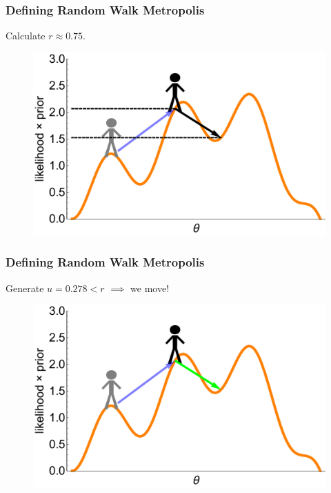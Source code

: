 \documentclass[handout]{beamer}
\begin{document}
\begin{frame}
\frametitle{Defining Random Walk Metropolis}
Calculate $r\approx 0.75$.

\begin{figure}[ht]
\centerline{\includegraphics[width=1\textwidth]{animations_figures/lec4_metropolisDefinition11.pdf}}
\end{figure}

\end{frame}

\begin{frame}
\frametitle{Defining Random Walk Metropolis}
Generate $u = 0.278 < r$ $\implies$ we move! 

\begin{figure}[ht]
\centerline{\includegraphics[width=1\textwidth]{animations_figures/lec4_metropolisDefinition12.pdf}}
\end{figure}

\end{frame}
\end{document}
